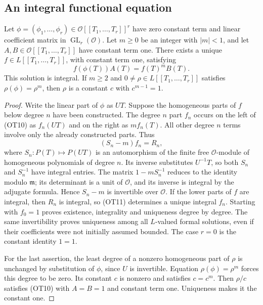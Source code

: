 \subsection{An integral functional equation}

\begin{theorem}\label{ot-functional-equation}
Let $\phi=(\phi_1,\ldots,\phi_r)\in
\mathcal O[[T_1,\ldots,T_r]]^r$ have zero constant term and
linear coefficient matrix in $\operatorname{GL}_r(\mathcal O)$.
Let $m\ge0$ be an integer with $|m|<1$, and let
$A,B\in\mathcal O[[T_1,\ldots,T_r]]$ have constant term one.
There exists a unique $f\in L[[T_1,\ldots,T_r]]$, with constant
term one, satisfying
\[
                     f(\phi(T))A(T)=f(T)^mB(T).
 \tag{OT10}
\]
This solution is integral.  If $m\ge2$ and
$0\ne\rho\in L[[T_1,\ldots,T_r]]$ satisfies
$\rho(\phi)=\rho^m$, then $\rho$ is a constant $c$ with
$c^{m-1}=1$.
\end{theorem}
\begin{proof}
Write the linear part of $\phi$ as $UT$.  Suppose the homogeneous
parts of $f$ below degree $n$ have been constructed.  The degree
$n$ part $f_n$ occurs on the left of (OT10) as $f_n(UT)$ and on
the right as $mf_n(T)$.  All other degree $n$ terms involve only
the already constructed parts.  Thus
\[
                       (S_n-m)f_n=R_n,
 \tag{OT11}
\]
where $S_n:P(T)\mapsto P(UT)$ is an automorphism of the finite
free $\mathcal O$-module of homogeneous polynomials of degree
$n$.  Its inverse substitutes $U^{-1}T$, so both $S_n$ and
$S_n^{-1}$ have integral entries.  The matrix
$1-mS_n^{-1}$ reduces to the identity modulo $\mathfrak m$;
its determinant is a unit of $\mathcal O$, and its inverse is
integral by the adjugate formula.  Hence $S_n-m$ is invertible
over $\mathcal O$.  If the lower parts of $f$ are integral, then
$R_n$ is integral, so (OT11) determines a unique integral $f_n$.
Starting with $f_0=1$ proves existence, integrality and uniqueness
degree by degree.  The same invertibility proves uniqueness among
all $L$-valued formal solutions, even if their coefficients were
not initially assumed bounded.  The case $r=0$ is the constant
identity $1=1$.

For the last assertion, the least degree of a nonzero homogeneous
part of $\rho$ is unchanged by substitution of $\phi$, since
$U$ is invertible.  Equation $\rho(\phi)=\rho^m$ forces this
degree to be zero.  Its constant $c$ is nonzero and satisfies
$c=c^m$.  Then $\rho/c$ satisfies (OT10) with $A=B=1$ and
constant term one.  Uniqueness makes it the constant one.
\end{proof}

